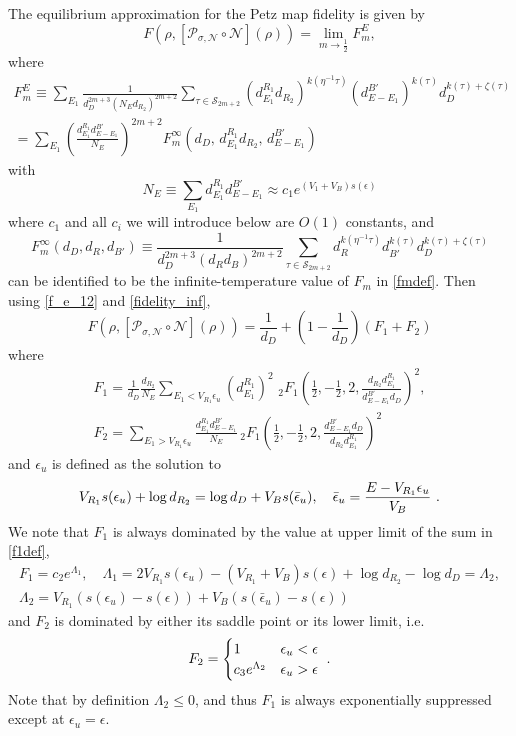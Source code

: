 \documentclass[a4paper,11pt]{article}
\newcommand\half{{\ensuremath{\frac{1}{2}}}}
\newcommand{\be}{\begin{equation}}
\newcommand{\ee}{\end{equation}}
\newcommand{\bega}{\begin{gather}}
\newcommand{\bca}{\begin{cases}}
\newcommand{\eca}{\end{cases}}
\newcommand\ep{\epsilon}
\newcommand\Lam{\Lambda}
\newcommand\ov{\over}
\newcommand\ha{{\half}}
\def\le{\left}
\def\ri{\right}
\newcommand\sS{{\mathcal S}}
\begin{document}
\begin{enumerate}
\begin{appendix}
The equilibrium approximation for the Petz map fidelity is given by 
\be 
F(\rho , [\mathcal{P}_{\sigma,\mathcal{N}}\circ \mathcal{N}](\rho)) = \lim_{m\rightarrow \ha} F^E_m, \label{f_e_12}
\ee 
where 
\be 
\begin{gathered} 
F_m^{E} \equiv \sum_{E_1} \frac{1}{d_D^{2m+3} (N_E d_{R_2})^{2m+2}} \sum_{\tau \in \sS_{2m+2}} (d^{R_1}_{E_1} d_{R_2})^{k(\eta^{-1}\tau)} (d^{B'}_{E-E_1})^{k(\tau)} d_D^{k(\tau)+\zeta(\tau)}\\
= \sum_{E_1}\left( \frac{d^{R_1}_{E_1}d^{B'}_{E- E_1}}{N_E}\right)^{2m+2}F_m^{\infty}(d_D, \, d^{R_1}_{E_1} d_{R_2}, \, d^{B'}_{E- E_1}) 
\end{gathered} 
\ee
with 
\be 
N_E \equiv \sum_{E_1}d^{R_1}_{E_1}d^{B'}_{E- E_1} \approx c_1 e^{(V_1 + V_B) s ( \ep) } 
\ee
where $c_1$ and all $c_i$ we will introduce below are $O(1)$ constants, 
and 
\be 
F_m^{\infty}(d_D, d_R, d_{B'}) \equiv \frac{1}{d_D^{2m+3} (d_R d_B)^{2m+2}} \sum_{\tau \in \sS_{2m+2}} d_R^{k(\eta^{-1}\tau)}d_{B'}^{k(\tau)} d_D^{k(\tau)+\zeta(\tau)}
\ee
can be identified to be the infinite-temperature value of $F_m$ in \eqref{fmdef}. 
Then using \eqref{f_e_12} and \eqref{fidelity_inf}, 
\be 
F(\rho , [\mathcal{P}_{\sigma,\mathcal{N}}\circ \mathcal{N}](\rho)) = \frac{1}{d_D} +\le(1-\frac{1}{d_D} \ri) (F_1 + F_2 ) 
\ee
where 
\bega
F_1 = \frac{1}{d_D} \frac{d_{R_2}}{N_E} \sum_{E_1 < V_{R_1} \ep_u} (d^{R_1}_{E_1})^2 \,  \, {}_2F_1\left(\ha, -\ha, 2, \frac{d_{R_2} d^{R_1}_{E_1}}{d^{B'}_{E- E_1}d_D} \right)^2 , \label{f1def} \\
F_2 =  \sum_{E_1 > V_{R_1} \ep_u} \frac{d^{R_1}_{E_1}d^{B'}_{E- E_1}}{N_E} \, {}_2F_1\left(\ha, -\ha, 2, \frac{d^{B'}_{E- E_1}d_D}{d_{R_2} d^{R_1}_{E_1}} \right)^2  \label{f2def}
\end{gather} 
and $\ep_u$ is defined as the solution to  
\be\label{ff0}
V_{R_1} s (\ep_u) + \log d_{R_2} = \log d_D + V_B s (\bar \ep_u) , \quad \bar \ep_u = {E - V_{R_1} \ep_u \ov V_B} \ .
\ee
We note that $F_1$ is always dominated by the value at upper limit of the sum in \eqref{f1def}, 
\bega \label{ff1}
F_1 = c_2 e^{\Lam_1} , \quad \Lam_1 = 2 V_{R_1} s (\ep_u) - (V_{R_1} + V_B) s ( \ep) + \log d_{R_2} - \log d_D
= \Lam_2 , \\
 \Lam_2 = V_{R_1} (s (\ep_u) - s (\ep)) + V_B (s (\bar \ep_u) - s ( \ep))
\end{gather} 
and $F_2$ is dominated by either its saddle point or its lower limit, i.e. 
\be \label{ff2}
F_2 = \bca 1 & \ep_u < \ep \cr
 c_3 e^{\Lam_2}  & \ep_u > \ep 
\eca \ .
\ee
Note that by definition $\Lam_2 \leq 0$, and thus $F_1$ is always exponentially suppressed except at $\ep_u = \ep$. 


\end{appendix}
\end{enumerate}
\end{document}
